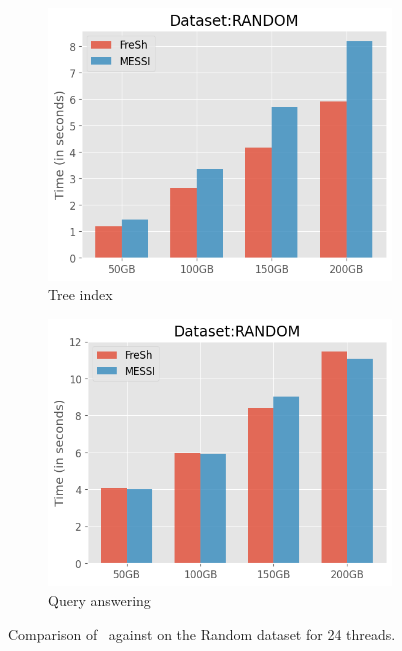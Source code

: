 \begin{figure}[htbp]
    \vspace{0.2cm} %

    \begin{subfigure}{0.45\textwidth}
        \includegraphics[width=\textwidth]{figures/Experiments/scale-dataset-random-tree.png}
        \caption{Tree index}
        \label{fig:eval:scale-dataset:random:tree-index}
    \end{subfigure}    
    \begin{subfigure}{0.45\textwidth}
        \includegraphics[width=\textwidth]{figures/Experiments/scale-dataset-random-query.png}
        \caption{Query answering}
        \label{fig:eval:scale-dataset:random:query-answering}
    \end{subfigure}                

    \caption{Comparison of \Fresh\ against \MESSI on the Random dataset for 24 threads.}
    \label{fig:eval:scale-dataset:random}
\end{figure}

